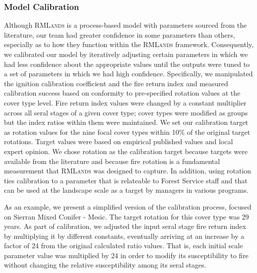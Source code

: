 \subsubsection{Model Calibration}
Although \textsc{RMLands} is a process-based model with parameters sourced from the literature, our team had greater confidence in some parameters than others, especially as to how they function within the \textsc{RMLands} framework. Consequently, we calibrated our model by iteratively adjusting certain parameters in which we had less confidence about the appropriate values until the outputs were tuned to a set of parameters in which we had high confidence. Specifically, we manipulated the ignition calibration coefficient and the fire return index and measured calibration success based on conformity to pre-specified rotation values at the cover type level. Fire return index values were changed by a constant multiplier across all seral stages of a given cover type; cover types were modified as groups but the index ratios within them were maintained. We set our calibration target as rotation values for the nine focal cover types within 10\% of the original target rotations. Target values were based on empirical published values and local expert opinion. We chose rotation as the calibration target because targets were available from the literature and because fire rotation is a fundamental measurement that \textsc{RMLands} was designed to capture. In addition, using rotation ties calibration to a parameter that is relateable to Forest Service staff and that can be used at the landscape scale as a target by managers in various programs.

As an example, we present a simplified version of the calibration process, focused on Sierran Mixed Conifer - Mesic. The target rotation for this cover type was 29 years. As part of calibration, we adjusted the input seral stage fire return index by multiplying it by different constants, eventually arriving at an increase by a factor of 24 from the original calculated ratio values. That is, each initial scale parameter value was multiplied by 24 in order to modify its susceptibility to fire without changing the relative susceptibility among its seral stages. 



